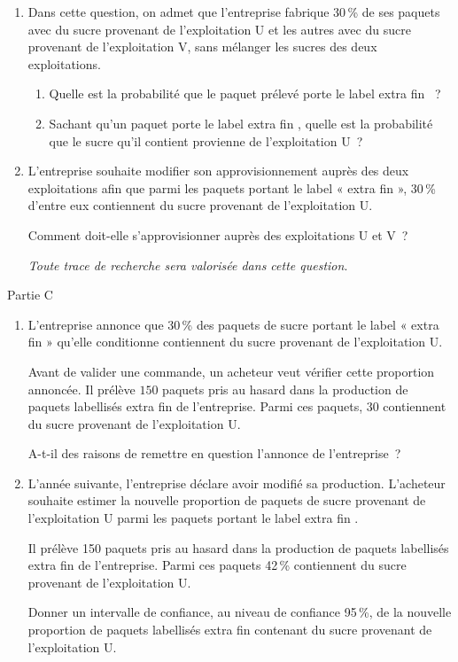 \medskip
\begin{enumerate}
     \item Dans cette question, on admet que l'entreprise fabrique 30\,\% de ses paquets avec du sucre
     provenant de l'exploitation U et les autres avec du sucre provenant de l'exploitation V,
     sans mélanger les sucres des deux exploitations.
     \begin{enumerate}[label=\alph*.]
          \item Quelle est la probabilité que le paquet prélevé porte le label \og extra fin \fg{}~?
          \item Sachant qu'un paquet porte le label \og extra fin \fg, quelle est la probabilité que le sucre
          qu'il contient provienne de l'exploitation U~?
     \end{enumerate}
     \item L'entreprise souhaite modifier son approvisionnement auprès des deux exploitations afin
     que parmi les paquets portant le label « extra fin », 30\,\% d'entre eux contiennent du sucre
     provenant de l'exploitation U.
     \par
     Comment doit-elle s'approvisionner auprès des exploitations U et V~?
     \par
     \emph{Toute trace de recherche sera valorisée dans cette question}.
\end{enumerate}
\begin{center}\begin{h3}Partie C \end{h3}\end{center}
\begin{enumerate}
     \item L'entreprise annonce que 30\,\% des paquets de sucre portant le label « extra fin » qu'elle
     conditionne contiennent du sucre provenant de l'exploitation U.
     \par
     Avant de valider une commande, un acheteur veut vérifier cette proportion annoncée. Il
     prélève $150$ paquets pris au hasard dans la production de paquets labellisés \og extra fin \fg{} de
     l'entreprise. Parmi ces paquets, $30$ contiennent du sucre provenant de l'exploitation U.
     \par
     A-t-il des raisons de remettre en question l'annonce de l'entreprise~?
     \item  L'année suivante, l'entreprise déclare avoir modifié sa production. L'acheteur souhaite
     estimer la nouvelle proportion de paquets de sucre provenant de l'exploitation U parmi les
     paquets portant le label \og extra fin \fg.
     \par
     Il prélève 150 paquets pris au hasard dans la production de paquets labellisés \og extra fin \fg{} de l'entreprise. Parmi ces paquets 42\,\% contiennent du sucre provenant de l'exploitation U.
     \par
     Donner un intervalle de confiance, au niveau de confiance 95\,\%, de la nouvelle proportion
     de paquets labellisés \og extra fin \fg{} contenant du sucre provenant de l'exploitation U.
\end{enumerate}
